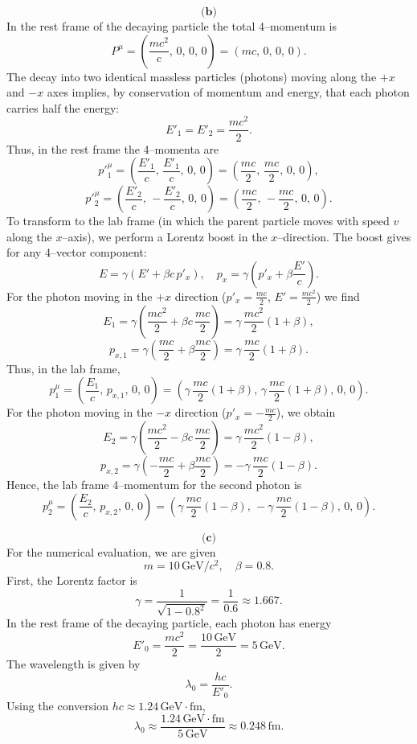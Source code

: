 \documentclass{article}
\begin{document}
\[
\textbf{(b)}
\]
In the rest frame of the decaying particle the total 4–momentum is
\[
P^\mu = \left(\frac{m c^2}{c},\,0,\,0,\,0\right) = \left(m c,\,0,\,0,\,0\right).
\]
The decay into two identical massless particles (photons) moving along the \(+x\) and \(-x\) axes implies, by conservation of momentum and energy, that each photon carries half the energy:
\[
E'_1 = E'_2 = \frac{m c^2}{2}.
\]
Thus, in the rest frame the 4–momenta are
\[
p'^\mu_1 = \left(\frac{E'_1}{c},\, \frac{E'_1}{c},\, 0,\, 0\right) 
= \left(\frac{m c}{2},\, \frac{m c}{2},\, 0,\, 0\right),
\]
\[
p'^\mu_2 = \left(\frac{E'_2}{c},\, -\frac{E'_2}{c},\, 0,\, 0\right) 
= \left(\frac{m c}{2},\, -\frac{m c}{2},\, 0,\, 0\right).
\]
To transform to the lab frame (in which the parent particle moves with speed \(v\) along the \(x\)–axis), we perform a Lorentz boost in the \(x\)–direction. The boost gives for any 4–vector component:
\[
E = \gamma\left(E' + \beta c\, p'_x\right), \quad
p_x = \gamma\left(p'_x + \beta \frac{E'}{c}\right).
\]
For the photon moving in the \(+x\) direction (\(p'_x = \frac{m c}{2}\), \(E'=\frac{m c^2}{2}\)) we find
\[
E_1 = \gamma\left(\frac{m c^2}{2} + \beta c\, \frac{m c}{2}\right)
= \gamma\,\frac{m c^2}{2}(1+\beta),
\]
\[
p_{x,1} = \gamma\left(\frac{m c}{2} + \beta \frac{m c}{2}\right)
= \gamma\,\frac{m c}{2}(1+\beta).
\]
Thus, in the lab frame,
\[
p^\mu_1 = \left(\frac{E_1}{c},\, p_{x,1},\,0,\,0\right)
= \left(\gamma\,\frac{m c}{2}(1+\beta),\, \gamma\,\frac{m c}{2}(1+\beta),\,0,\,0\right).
\]
For the photon moving in the \(-x\) direction (\(p'_x = -\frac{m c}{2}\)), we obtain
\[
E_2 = \gamma\left(\frac{m c^2}{2} - \beta c\, \frac{m c}{2}\right)
= \gamma\,\frac{m c^2}{2}(1-\beta),
\]
\[
p_{x,2} = \gamma\left(-\frac{m c}{2} + \beta \frac{m c}{2}\right)
= -\gamma\,\frac{m c}{2}(1-\beta).
\]
Hence, the lab frame 4–momentum for the second photon is
\[
p^\mu_2 = \left(\frac{E_2}{c},\, p_{x,2},\,0,\,0\right)
= \left(\gamma\,\frac{m c}{2}(1-\beta),\, -\gamma\,\frac{m c}{2}(1-\beta),\,0,\,0\right).
\]

\vspace{5mm}

\[
\textbf{(c)}
\]
For the numerical evaluation, we are given
\[
m = 10\,\text{GeV}/c^2,\quad \beta = 0.8.
\]
First, the Lorentz factor is
\[
\gamma = \frac{1}{\sqrt{1-0.8^2}} = \frac{1}{0.6} \approx 1.667.
\]
In the rest frame of the decaying particle, each photon has energy
\[
E'_0 = \frac{m c^2}{2} = \frac{10\,\text{GeV}}{2} = 5\,\text{GeV}.
\]
The wavelength is given by
\[
\lambda_0 = \frac{hc}{E'_0}.
\]
Using the conversion \(hc \approx 1.24\,\text{GeV}\cdot\text{fm}\),
\[
\lambda_0 \approx \frac{1.24\,\text{GeV}\cdot\text{fm}}{5\,\text{GeV}} \approx 0.248\,\text{fm}.
\]
\end{document}
